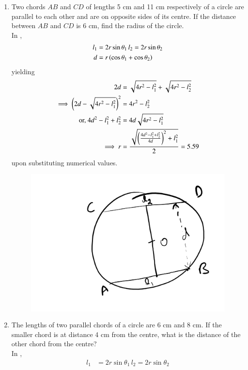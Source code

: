 \begin{enumerate}[label=\thesubsection.\arabic*,ref=\thesubsection.\theenumi]
\begin{figure}[H]
\begin{center}
	\end{center}
	\caption{}
	\label{fig:ncert-circ-3}	
\end{figure}
%
\item Two chords $AB$ and $CD$ of lengths 5 cm and 11 cm respectively of a circle are parallel
to each other and are on opposite sides of its centre. If the distance between $AB$ and
$CD$ is 6 cm, find the radius of the circle.
	\\
		\solution 
	In , 
\begin{align}
	l_1&=2r \sin \theta_1\,
	l_2=2r \sin \theta_2
	\\
	d &= r \left(\cos \theta_1+\cos \theta_2\right)
\end{align}
yielding
\begin{align}
	2d &=  \sqrt{4r^2-l_1^2}+\sqrt{4r^2-l_2^2}
	\\
	\implies 
	\left(2d -  \sqrt{4r^2-l_1^2}\right)^2&=4r^2-l_2^2
	\\
	\text{or, }4d^2 -l_1^2+l_2^2&=4d\sqrt{4r^2-l_1^2}
	\\
	\implies r &= \frac{\sqrt{\left(\frac{4d^2 -l_1^2+l_2^2}{4d}\right)^2+l_1^2}}{2} = 5.59 
\end{align}
upon substituting numerical values.
\begin{figure}[H]
	\begin{center}
		{\includegraphics[width=0.6\columnwidth]{figs/ncert/circle/4.png}}
	\end{center}
	\caption{}
	\label{fig:ncert-circ-4}	
\end{figure}
%
\item The lengths of two parallel chords of a circle are 6 cm and 8 cm. If the smaller chord is
at distance 4 cm from the centre, what is the distance of the other chord from the
centre?
\\
\solution
	In , 
\begin{align}
	l_1&=2r \sin \theta_1\,
	l_2=2r \sin \theta_2
	\\

\end{align}
\end{enumerate}
